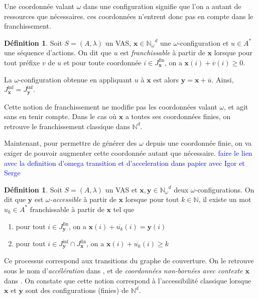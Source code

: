 \documentclass[a4paper,final]{article}
\theoremstyle{definition}
\newtheorem{Definition}[Theorem]{Définition}
\let\geq\geqslant
\newcommand{\alain}[1]{\textcolor{blue}{#1}}
\let\inter\cap
\newcommand{\N}{\ensuremath{\mathbb{N}}}
\newcommand{\Nomega}{\ensuremath{\mathbb{N}_\omega}}
\newcommand{\vect}[1]{\ensuremath{\mathbf{#1}}}
\newcommand{\valeur}[1]{\ensuremath{\overline{#1}}}
\newcommand{\Jfin}[1]{J^\text{fin}_{#1}}
\newcommand{\Jinf}[1]{J^\text{inf}_{#1}}
\begin{document}
Une coordonnée valant $\omega$ dans une configuration signifie que l'on a autant de ressources que nécessaires.
ces coordonnées n'entrent donc pas en compte dans le franchissement.

\begin{Definition}
Soit $S = (A,\lambda)$ un VAS, $\vect{x} \in \Nomega^d$ une $\omega$-configuration et $u \in A^*$ une séquence d'actions.
On dit que $u$ est \emph{franchissable} à partir de $\vect{x}$ lorsque pour tout préfixe $v$ de $u$ et pour toute coordonnée $i \in \Jfin{\vect{x}}$, on a $\vect{x}(i) + \valeur{v}(i) \geq 0$.

La $\omega$-configuration obtenue en appliquant $u$ à $\vect{x}$ est alors $\vect{y} = \vect{x} + \valeur{u}$.
Ainsi, $\Jinf{\vect{x}} = \Jinf{\vect{y}}$.
\end{Definition}

Cette notion de franchissement ne modifie pas les coordonnées valant $\omega$, et agit sans en tenir compte.
Dans le cas où $\vect{x}$ a toutes ses coordonnées finies, on retrouve le franchissement classique dans $\N^d$.

Maintenant, pour permettre de générer des $\omega$ depuis une coordonnée finie, on va exiger de pouvoir augmenter cette coordonnée autant que nécessaire.
\alain{faire le lien avec la definition d'omega transition et d'acceleration dans papier avec Igor et Serge}

\begin{Definition}
Soit $S = (A,\lambda)$ un VAS et $\vect{x},\vect{y} \in \Nomega^d$ deux $\omega$-configurations.
On dit que $\vect{y}$ est \emph{$\omega$-accessible} à partir de $\vect{x}$ lorsque pour tout $k\in\N$, il existe un mot $u_k \in A^*$ franchissable à partir de $\vect{x}$ tel que 
\begin{enumerate}
    \item pour tout $i\in\Jfin{\vect{y}}$, on a $\vect{x}(i) + \valeur{u_k}(i) = \vect{y}(i)$
    \item pour tout $i\in \Jinf{\vect{y}} \inter \Jfin{\vect{x}}$, on a $\vect{x}(i) + \valeur{u_k}(i) \geq k$
\end{enumerate}
\end{Definition}

Ce processus correspond aux transitions du graphe de couverture.
On le retrouve sous le nom d'\emph{accélération} dans \cite{FHK-fossacs2020}, et de \emph{coordonnées non-bornées avec contexte \vect{x}} dans \cite{vavn81}.
On constate que cette notion correspond à l'accessibilité classique lorsque $\vect{x}$ et $\vect{y}$ sont des configurations (finies) de $\N^d$.
\end{document}

